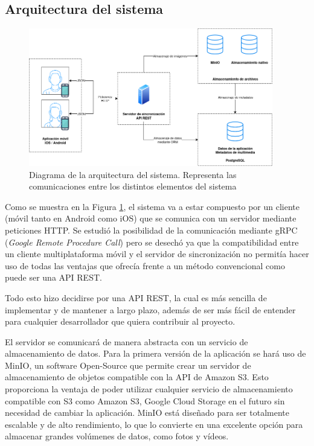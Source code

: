 \subsection{Arquitectura del sistema}
\begin{figure}[H]
    \begin{center}
        \includegraphics[width=0.95\textwidth]{images/diagrama-arquitectura.png}
    \end{center}
    \caption{Diagrama de la arquitectura del sistema. Representa las comunicaciones entre los distintos elementos del sistema}\label{fig:diagrama-arquitectura}
\end{figure}

Como se muestra en la Figura \ref{fig:diagrama-arquitectura}, el sistema va a estar compuesto por un cliente (móvil tanto en Android como iOS) que se comunica con un servidor mediante peticiones HTTP.
Se estudió la posibilidad de la comunicación mediante gRPC (\textit{Google Remote Procedure Call}) pero se desechó ya que la compatibilidad entre un cliente multiplataforma móvil y el servidor de sincronización no permitía hacer uso de todas las ventajas que ofrecía frente a un método convencional como puede ser una API REST.

Todo esto hizo decidirse por una API REST, la cual es más sencilla de implementar y de mantener a largo plazo, además de ser más fácil de entender para cualquier desarrollador que quiera contribuir al proyecto.

El servidor se comunicará de manera abstracta con un servicio de almacenamiento de datos. Para la primera versión de la aplicación se hará uso de MinIO, un software Open-Source que permite crear un servidor de almacenamiento de objetos compatible con la API de Amazon S3.
Esto proporciona la ventaja de poder utilizar cualquier servicio de almacenamiento compatible con S3 como Amazon S3, Google Cloud Storage en el futuro sin necesidad de cambiar la aplicación.
MinIO está diseñado para ser totalmente escalable y de alto rendimiento, lo que lo convierte en una excelente opción para almacenar grandes volúmenes de datos, como fotos y vídeos.

